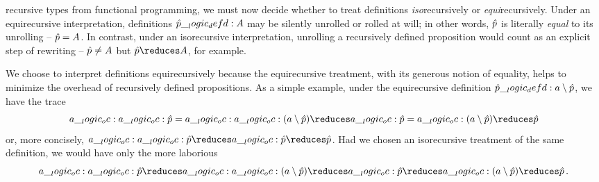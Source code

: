  recursive types from functional programming\autocite{??}, we must now decide whether to treat definitions \emph{iso}\-re\-cur\-sively or \emph{equi}\-re\-cur\-sively.
Under an equirecursive interpretation, definitions $\hat{p} \__logic_defd: A$ may be silently unrolled or rolled at will;
in other words, $\hat{p}$ is literally \emph{equal} to its unrolling -- $\hat{p} = A$.
In contrast, under an isorecursive interpretation, unrolling a recursively defined proposition would count as an explicit step of rewriting -- $\hat{p} \neq A$ but $\defp{p} \reduces A$, for example.


We choose to interpret definitions equirecursively
because the equirecursive treatment, with its generous notion of equality, helps to minimize the overhead of recursively defined propositions.
As a simple example, under the equirecursive definition $\hat{p} \__logic_defd: a \mathbin { \setminus } \hat{p}$, we have the trace
\begin{equation*}
  a \oc a \oc \defp{p} = a \oc a \oc (a \limp \defp{p}) \reduces a \oc \defp{p} = a \oc (a \limp \defp{p}) \reduces \defp{p}
\end{equation*}
or, more concisely, $a \oc a \oc \defp{p} \reduces a \oc \defp{p} \reduces \defp{p}$.
Had we chosen
 an isorecursive treatment of the same definition, we would have only the more laborious
\begin{equation*}
  a \oc a \oc \defp{p} \reduces a \oc a \oc (a \limp \defp{p}) \reduces a \oc \defp{p} \reduces a \oc (a \limp \defp{p}) \reduces \defp{p}
  \,.
\end{equation*}


